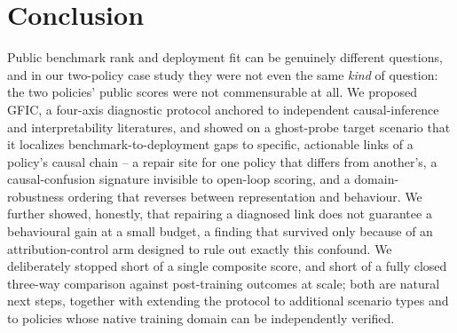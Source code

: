 \section{Conclusion}

Public benchmark rank and deployment fit can be genuinely different questions, and in our
two-policy case study they were not even the same \emph{kind} of question: the two
policies' public scores were not commensurable at all. We proposed GFIC, a four-axis
diagnostic protocol anchored to independent causal-inference and interpretability
literatures, and showed on a ghost-probe target scenario that it localizes
benchmark-to-deployment gaps to specific, actionable links of a policy's causal chain --
a repair site for one policy that differs from another's, a causal-confusion signature
invisible to open-loop scoring, and a domain-robustness ordering that reverses between
representation and behaviour. We further showed, honestly, that repairing a diagnosed
link does not guarantee a behavioural gain at a small budget, a finding that survived
only because of an attribution-control arm designed to rule out exactly this confound.
We deliberately stopped short of a single composite score, and short of a fully closed
three-way comparison against post-training outcomes at scale; both are natural next
steps, together with extending the protocol to additional scenario types and to policies
whose native training domain can be independently verified.
